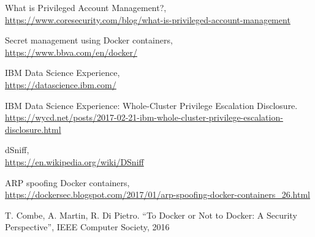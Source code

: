 \documentclass[a4paper,12pt]{article}
\begin{document}
\begin{thebibliography}{99}
What is Privileged Account Management?, \\ \url{https://www.coresecurity.com/blog/what-is-privileged-account-management}

Secret management using Docker containers, \\ \url{https://www.bbva.com/en/docker/}

IBM Data Science Experience, \\ \url{https://datascience.ibm.com/}

IBM Data Science Experience: Whole-Cluster Privilege Escalation Disclosure. \\ \url{https://wycd.net/posts/2017-02-21-ibm-whole-cluster-privilege-escalation-disclosure.html}

dSniff, \\ \url{https://en.wikipedia.org/wiki/DSniff}

ARP spoofing Docker containers, \\ \url{https://dockersec.blogspot.com/2017/01/arp-spoofing-docker-containers_26.html}

T. Combe, A. Martin, R. Di Pietro. ``To Docker or Not to Docker: A Security
Perspective'', IEEE Computer Society, 2016

\end{thebibliography}
\end{document}
